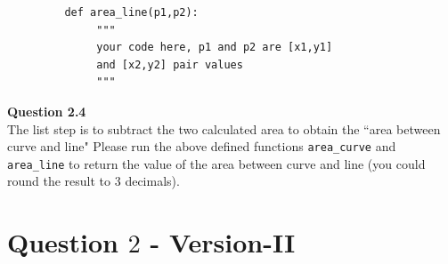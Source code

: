 \documentclass[a4paper]{article}
\begin{document}
\begin{answer}
    \begin{lstlisting}
         def area_line(p1,p2):
              """
              your code here, p1 and p2 are [x1,y1]
              and [x2,y2] pair values
              """
     \end{lstlisting}

     \textbf{Question 2.4} \\
     The list step is to subtract the two calculated area to obtain the ``area between curve and line" Please run the above defined functions \texttt{area_curve} and \texttt{area_line} to return the value of the area between curve and line (you could round the result to 3 decimals).

    \end{answer}



    \section{Question $2$ - Version-II}
\end{document}
